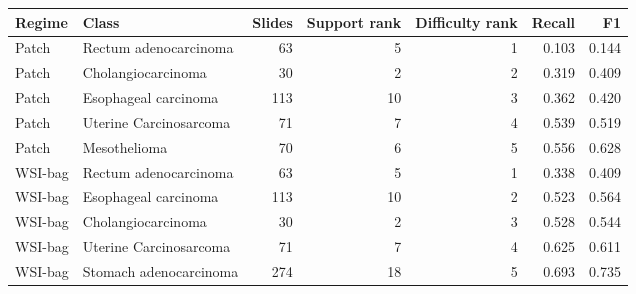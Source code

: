 \begin{tabularx}{\linewidth}{@{}lXrrrrr@{}}
\toprule
Regime & Class & Slides & Support rank & Difficulty rank & Recall & F1\\
\midrule
Patch & Rectum adenocarcinoma & \num{63} & 5 & 1 & \num{0.103} & \num{0.144}\\
Patch & Cholangiocarcinoma & \num{30} & 2 & 2 & \num{0.319} & \num{0.409}\\
Patch & Esophageal carcinoma & \num{113} & 10 & 3 & \num{0.362} & \num{0.420}\\
Patch & Uterine Carcinosarcoma & \num{71} & 7 & 4 & \num{0.539} & \num{0.519}\\
Patch & Mesothelioma & \num{70} & 6 & 5 & \num{0.556} & \num{0.628}\\
WSI-bag & Rectum adenocarcinoma & \num{63} & 5 & 1 & \num{0.338} & \num{0.409}\\
WSI-bag & Esophageal carcinoma & \num{113} & 10 & 2 & \num{0.523} & \num{0.564}\\
WSI-bag & Cholangiocarcinoma & \num{30} & 2 & 3 & \num{0.528} & \num{0.544}\\
WSI-bag & Uterine Carcinosarcoma & \num{71} & 7 & 4 & \num{0.625} & \num{0.611}\\
WSI-bag & Stomach adenocarcinoma & \num{274} & 18 & 5 & \num{0.693} & \num{0.735}\\
\bottomrule
\end{tabularx}
